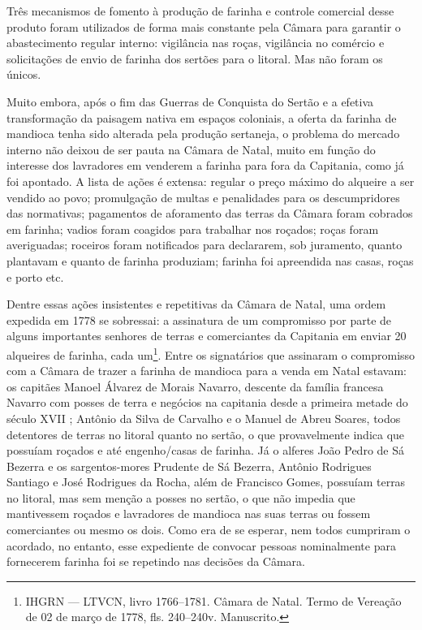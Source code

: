 \begin{refsection}
Três mecanismos de fomento à produção de farinha e controle comercial desse produto foram utilizados de forma mais constante pela Câmara para garantir o abastecimento regular interno: vigilância nas roças, vigilância no comércio e solicitações de envio de farinha dos sertões para o litoral. Mas não foram os únicos.  

Muito embora, após o fim das Guerras de Conquista do Sertão e a efetiva transformação da paisagem nativa em espaços coloniais, a oferta da farinha de mandioca tenha sido alterada pela produção sertaneja, o problema do mercado interno não deixou de ser pauta na Câmara de Natal, muito em função do interesse dos lavradores em venderem a farinha para fora da Capitania, como já foi apontado. A lista de ações é extensa: regular o preço máximo do alqueire a ser vendido ao povo; promulgação de multas e penalidades para os descumpridores das normativas; pagamentos de aforamento das terras da Câmara foram cobrados em farinha; vadios foram coagidos para trabalhar nos roçados; roças foram averiguadas; roceiros foram notificados para declararem, sob juramento, quanto plantavam e quanto de farinha produziam; farinha foi apreendida nas casas, roças e porto etc.  

Dentre essas ações insistentes e repetitivas da Câmara de Natal, uma ordem expedida em 1778 se sobressai: a assinatura de um compromisso por parte de alguns importantes senhores de terras e comerciantes da Capitania em enviar 20 alqueires de farinha, cada um\footnote{IHGRN --- LTVCN, livro 1766--1781. Câmara de Natal. Termo de Vereação de 02 de março de 1778, fls. 240--240v. Manuscrito.}. Entre os signatários que assinaram o compromisso com a Câmara de trazer a farinha de mandioca para a venda em Natal estavam: os capitães Manoel Álvarez de Morais Navarro, descente da família francesa Navarro com posses de terra e negócios na capitania desde a primeira metade do século XVII \cite{Dias2016gentes}; Antônio da Silva de Carvalho e o Manuel de Abreu Soares, todos detentores de terras no litoral quanto no sertão, o que provavelmente indica que possuíam roçados e até engenho/casas de farinha. Já o alferes João Pedro de Sá Bezerra e os sargentos-mores Prudente de Sá Bezerra, Antônio Rodrigues Santiago e José Rodrigues da Rocha, além de Francisco Gomes, possuíam terras no litoral, mas sem menção a posses no sertão, o que não impedia que mantivessem roçados e lavradores de mandioca nas suas terras ou fossem comerciantes ou mesmo os dois. Como era de se esperar, nem todos cumpriram o acordado, no entanto, esse expediente de convocar pessoas nominalmente para fornecerem farinha foi se repetindo nas decisões da Câmara. 


\end{refsection}
